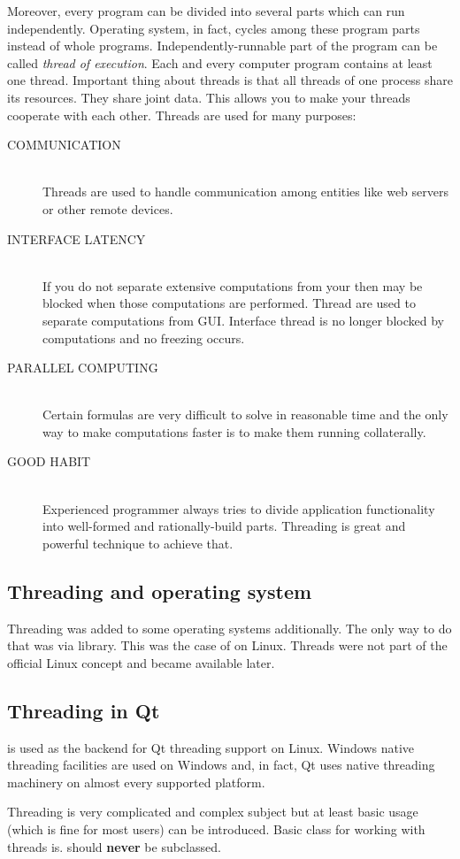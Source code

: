 Moreover, every program can be divided into several parts which can run independently. Operating system, in fact, cycles among these program parts instead of whole programs. Independently-runnable part of the program can be called \textit{thread of execution}. Each and every computer program contains at least one thread. Important thing about threads is that all threads of one process share its resources. They share joint data. This allows you to make your threads cooperate with each other. Threads are used for many purposes:
\begin{description}
\item[COMMUNICATION] \hfill \\
Threads are used to handle communication among entities like web servers or other remote devices.
\item[INTERFACE LATENCY] \hfill \\
If you do not separate extensive computations from your  then  may be blocked when those computations are performed. Thread are used to separate computations from GUI. Interface thread is no longer blocked by computations and no freezing occurs.
\item[PARALLEL COMPUTING] \hfill \\
Certain formulas are very difficult to solve in reasonable time and the only way to make computations faster is to make them running collaterally.
\item[GOOD HABIT] \hfill \\
Experienced programmer always tries to divide application functionality into well-formed and rationally-build parts. Threading is great and powerful technique to achieve that.
\end{description}

\subsection{Threading and operating system}
Threading was added to some operating systems additionally. The only way to do that was via library. This was the case of  on Linux. Threads were not part of the official Linux concept and became available later.

\subsection{Threading in Qt}
 is used as the backend for Qt threading support on Linux. Windows native threading facilities are used on Windows and, in fact, Qt uses native threading machinery on almost every supported platform.

Threading is very complicated and complex subject but at least basic usage (which is fine for most users) can be introduced. Basic class for working with threads is. \citep[QThread class]{various:qtdoc}   should \textbf{never} be subclassed.